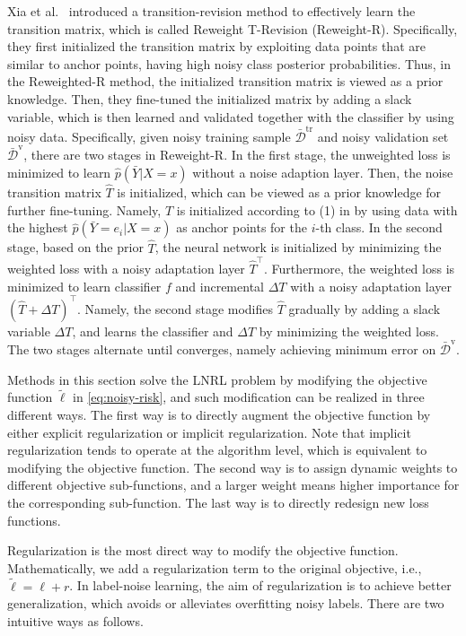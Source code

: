 Xia et al.~ introduced a transition-revision method to effectively learn the transition matrix, 
which is called Reweight T-Revision (Reweight-R). 
Specifically, they first initialized the transition matrix by exploiting data points that are similar to anchor points, having high noisy class posterior probabilities. Thus, in the Reweighted-R method, the initialized transition matrix is viewed as a prior knowledge. Then, they fine-tuned the initialized matrix by adding a slack variable, which is then learned and validated together with the classifier by using noisy data.
Specifically, given noisy training sample 
$\bar{\mathcal{D}}^{\text{tr}}$ and noisy validation set $\bar{\mathcal{D}}^{\text{v}}$, 
there are two stages in Reweight-R. In the first stage, the unweighted loss is minimized to learn $\hat{p}(\bar{Y}|X=x)$ without a noise adaption layer. 
Then, the noise transition matrix $\hat{T}$ is initialized, 
which can be viewed as a prior knowledge for further fine-tuning. 
Namely, $\hat{T}$ is initialized according to (1) in  by using data with the highest $\hat{p}(\bar{Y} = e_i|X=x)$ as anchor points for the $i$-th class.
In the second stage, based on the prior $\hat{T}$, the neural network is initialized by minimizing the weighted loss with a noisy adaptation layer $\hat{T}^\top$. 
Furthermore, the weighted loss is minimized to learn classifier $f$ and incremental $\Delta T$ with a noisy adaptation layer $(\hat{T} + \Delta T)^\top$. 
Namely, the second stage modifies $\hat{T}$ gradually by adding a slack variable $\Delta T$, 
and learns the classifier and $\Delta T$ by minimizing the weighted loss. 
The two stages alternate until converges, namely achieving minimum error on $\bar{\mathcal{D}}^{\text{v}}$.

\label{sec:obj}
Methods in this section solve the LNRL problem by modifying the objective function $\tilde{\ell}$ in \eqref{eq:noisy-risk}, 
and such modification can be realized in 
three different ways. 
The first way is to directly augment the objective function by either explicit regularization or implicit regularization. 
Note that  implicit regularization tends to operate at the algorithm level, 
which is equivalent to modifying the objective function. 
The second way is to assign dynamic weights to different objective sub-functions, 
and a larger weight means higher importance for the corresponding sub-function. The last way is to directly 
redesign new loss functions.

Regularization is the most direct way to modify the objective function. 
Mathematically, we  add a regularization term to the original objective, i.e., $\tilde{\ell} = \ell + r$. 
In label-noise learning, the aim of regularization is to achieve better generalization, which avoids or alleviates overfitting noisy labels.
There are two intuitive ways as follows.

